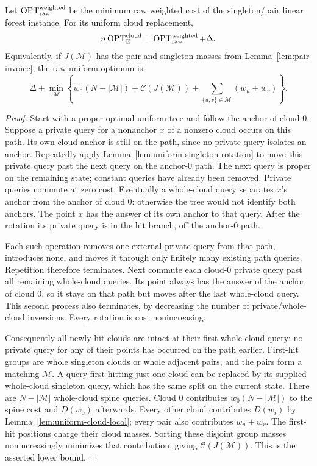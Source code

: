 \begin{theorem}\label{thm:uniform-cloud-transfer}
Let $\operatorname{OPT}_{\mathrm{raw}}^{\mathrm{weighted}}$ be the minimum
raw weighted cost of the singleton/pair linear forest instance.
For its uniform cloud replacement,
\begin{equation}\label{eq:uniform-cloud-transfer}
 n\operatorname{OPT}_{\mathrm E}^{\mathrm{cloud}}
   =\operatorname{OPT}_{\mathrm{raw}}^{\mathrm{weighted}}+\Delta.
\end{equation}
Equivalently, if $J(\mathcal M)$ has the pair and singleton masses
from Lemma~\ref{lem:pair-invoice}, the raw uniform optimum is
\[
 \Delta+\min_{\mathcal M}
 \left\{w_0(N-|\mathcal M|)
   +\mathcal C(J(\mathcal M))
   +\sum_{\{u,v\}\in\mathcal M}(w_u+w_v)\right\}.
\]
\end{theorem}
\begin{proof}
Start with a proper optimal uniform tree and follow the anchor
of cloud $0$. Suppose a private query for a nonanchor $x$ of a
nonzero cloud occurs on this path. Its own cloud anchor is still
on the path, since no private query isolates an anchor.
Repeatedly apply Lemma~\ref{lem:uniform-singleton-rotation} to
move this private query past the next query on the anchor-$0$
path. The next query is proper on the remaining state; constant
queries have already been removed. Private queries commute
at zero cost. Eventually a whole-cloud query separates $x$'s
anchor from the anchor of cloud $0$: otherwise the tree would
not identify both anchors. The point $x$ has the answer of its
own anchor to that query. After the rotation its private query
is in the hit branch, off the anchor-$0$ path.

Each such operation removes one external private query from
that path, introduces none, and moves it through only finitely
many existing path queries. Repetition therefore terminates.
Next commute each cloud-$0$ private query past all remaining
whole-cloud queries. Its point always has the answer of the
anchor of cloud $0$, so it stays on that path but moves after
the last whole-cloud query. This second process also terminates,
by decreasing the number of private/whole-cloud inversions.
Every rotation is cost nonincreasing.

Consequently all newly hit clouds are intact at their first
whole-cloud query: no private query for any of their points
has occurred on the path earlier. First-hit groups are whole
singleton clouds or whole adjacent pairs, and the pairs form
a matching $\mathcal M$. A query first hitting just one cloud
can be replaced by its supplied whole-cloud singleton query,
which has the same split on the current state. There are
$N-|\mathcal M|$ whole-cloud spine queries. Cloud $0$ contributes
$w_0(N-|\mathcal M|)$ to the spine cost and $D(w_0)$ afterwards.
Every other cloud contributes $D(w_i)$ by
Lemma~\ref{lem:uniform-cloud-local}; every pair also contributes
$w_u+w_v$. The first-hit positions charge their cloud masses.
Sorting these disjoint group masses nonincreasingly minimizes
that contribution, giving $\mathcal C(J(\mathcal M))$.
This is the asserted lower bound.


\end{proof}
